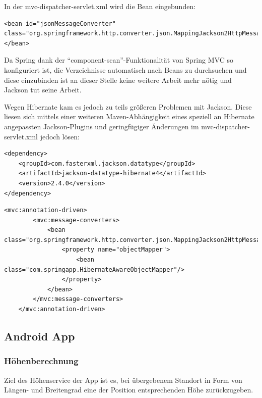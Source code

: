 In der mvc-dispatcher-servlet.xml wird die Bean eingebunden:
\lstset{language=xml}
\begin{lstlisting}[frame=htrbl, caption={Ausschnitt aus mvc-dispatcher-servlet.xml}, breaklines=true]
<bean id="jsonMessageConverter" class="org.springframework.http.converter.json.MappingJackson2HttpMessageConverter">
</bean>
\end{lstlisting}

Da Spring dank der ``component-scan''-Funktionalität von Spring MVC so konfiguriert ist, die Verzeichnisse automatisch nach Beans zu durchsuchen und diese einzubinden ist an dieser Stelle keine weitere Arbeit mehr nötig und Jackson tut seine Arbeit.

Wegen Hibernate kam es jedoch zu teils größeren Problemen mit Jackson. Diese liesen sich mittels einer weiteren Maven-Abhängigkeit eines speziell an Hibernate angepassten Jackson-Plugins und geringfügiger Änderungen im mvc-dispatcher-servlet.xml jedoch lösen:
\lstset{language=xml}
\begin{lstlisting}[frame=htrbl, caption={Ausschnitt aus der pom.xml}, breaklines=true]
<dependency>
	<groupId>com.fasterxml.jackson.datatype</groupId>
	<artifactId>jackson-datatype-hibernate4</artifactId>
	<version>2.4.0</version>
</dependency>
\end{lstlisting}
\lstset{language=xml}
\begin{lstlisting}[frame=htrbl, caption={Ausschnitt aus mvc-dispatcher-servlet.xml}, breaklines=true]
<mvc:annotation-driven>
        <mvc:message-converters>
            <bean class="org.springframework.http.converter.json.MappingJackson2HttpMessageConverter">
                <property name="objectMapper">
                    <bean class="com.springapp.HibernateAwareObjectMapper"/>
                </property>
            </bean>
        </mvc:message-converters>
    </mvc:annotation-driven>
\end{lstlisting}
\subsection{Android App}
\subsubsection{Höhenberechnung}
Ziel des Höhenservice der App ist es, bei übergebenem Standort in Form von Längen- und Breitengrad eine der Position entsprechenden Höhe zurückzugeben.
